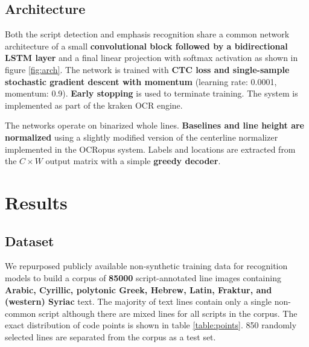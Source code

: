 \subsection*{Architecture}

Both the script detection and emphasis recognition share a common network
architecture of a small \textbf{convolutional block followed by a bidirectional LSTM
layer} and a final linear projection with softmax activation as shown in figure
\ref{fig:arch}. The network is trained with \textbf{CTC loss and single-sample
stochastic gradient descent with momentum} (learning rate: 0.0001, momentum:
0.9). \textbf{Early stopping} is used to terminate training. The system is implemented
as part of the kraken OCR engine.

The networks operate on binarized whole lines. \textbf{Baselines and line height are
normalized} using a slightly modified version of the centerline normalizer
implemented in the OCRopus system. Labels and locations are extracted from the
$C\times W$ output matrix with a simple \textbf{greedy decoder}. 

\section*{Results}

\subsection*{Dataset}

We repurposed publicly available non-synthetic training data for recognition
models to build a corpus of \textbf{85000} script-annotated line images containing
\textbf{Arabic, Cyrillic, polytonic Greek, Hebrew, Latin, Fraktur, and (western) Syriac}
text. The majority of text lines contain only a single non-common script
although there are mixed lines for all scripts in the corpus. The exact
distribution of code points is shown in table \ref{table:points}. 850 randomly
selected lines are separated from the corpus as a test set.

